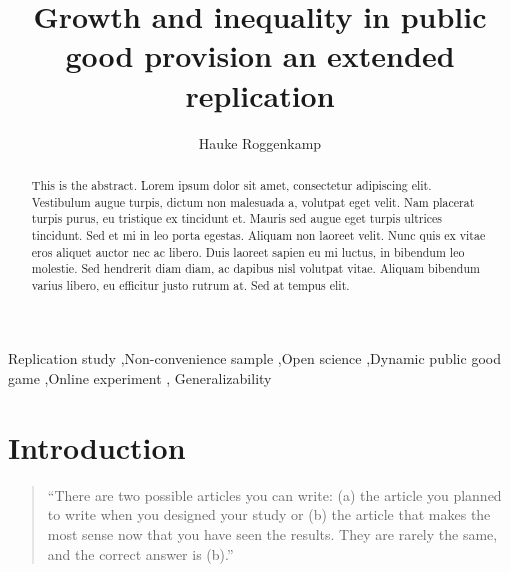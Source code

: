 \documentclass[
  authoryear,
  preprint,
  3p]{elsarticle}
\begin{document}
\begin{frontmatter}
\title{Growth and inequality in public good provision \textbar{} an
extended replication}
\author[1,2]{Hauke Roggenkamp%
%
}



        
\begin{abstract}
This is the abstract. Lorem ipsum dolor sit amet, consectetur adipiscing
elit. Vestibulum augue turpis, dictum non malesuada a, volutpat eget
velit. Nam placerat turpis purus, eu tristique ex tincidunt et. Mauris
sed augue eget turpis ultrices tincidunt. Sed et mi in leo porta
egestas. Aliquam non laoreet velit. Nunc quis ex vitae eros aliquet
auctor nec ac libero. Duis laoreet sapien eu mi luctus, in bibendum leo
molestie. Sed hendrerit diam diam, ac dapibus nisl volutpat vitae.
Aliquam bibendum varius libero, eu efficitur justo rutrum at. Sed at
tempus elit.
\end{abstract}





\begin{keyword}
    Replication study \sep Non-convenience sample \sep Open
science \sep Dynamic public good game \sep Online experiment \sep 
    Generalizability
\end{keyword}
\end{frontmatter}\ifdefined\Shaded\renewenvironment{Shaded}{\begin{tcolorbox}[borderline west={3pt}{0pt}{shadecolor}, boxrule=0pt, frame hidden, breakable, sharp corners, enhanced, interior hidden]}{\end{tcolorbox}}\fi

\hypertarget{introduction}{%
\section{Introduction}\label{introduction}}

\begin{quote}
``There are two possible articles you can write: (a) the article you
planned to write when you designed your study or (b) the article that
makes the most sense now that you have seen the results. They are rarely
the same, and the correct answer is (b).'' \citep[p.~171]{bemwriting}
\end{quote}
\end{document}
